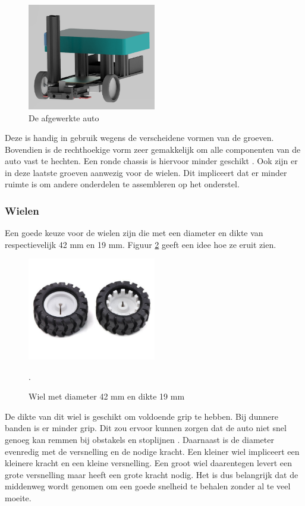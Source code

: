 \documentclass[a4paper,twoside,kulak]{kulakreport} %
\begin{document}
\begin{figure}
	\includegraphics[width=0.5\textwidth]{4Volledig}
	\centering
	\caption{De afgewerkte auto}
	\label{opbouw4}
\end{figure}

Deze is handig in gebruik wegens de verscheidene vormen van de groeven. %
Bovendien is de rechthoekige vorm zeer gemakkelijk om alle componenten van de auto vast te hechten. Een ronde chassis is hiervoor minder geschikt \cite{RobotChassis}. Ook zijn er in deze laatste groeven aanwezig voor de wielen. Dit impliceert dat er minder ruimte is om andere onderdelen te assembleren op het onderstel. %
\label{Chassis}

\subsubsection{Wielen}
Een goede keuze voor de wielen zijn die met een diameter en dikte van respectievelijk 42 mm en 19 mm.
Figuur \ref{fig:wiel} geeft een idee hoe ze eruit zien.

\begin{figure}
	\includegraphics[width=0.5\textwidth]{wielen}
	\centering
	\caption{Wiel met diameter 42 mm en dikte 19 mm} 
	\cite{Wiel42x19mm}.
	\label{fig:wiel}
\end{figure}

De dikte van dit wiel is geschikt om voldoende grip te hebben. Bij dunnere banden is er minder grip. Dit zou ervoor kunnen zorgen dat de auto niet snel genoeg kan remmen bij obstakels en stoplijnen \cite{Banden}. 
Daarnaast is de diameter evenredig met de versnelling en de nodige kracht. Een kleiner wiel impliceert een kleinere kracht en een kleine versnelling. Een groot wiel daarentegen levert een grote versnelling maar heeft een grote kracht nodig. Het is dus belangrijk dat de middenweg wordt genomen om een goede snelheid te behalen zonder al te veel moeite.  
\end{document}
